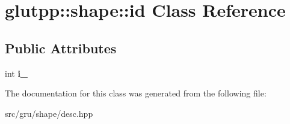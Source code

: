 \hypertarget{classglutpp_1_1shape_1_1id}{\section{glutpp\-:\-:shape\-:\-:id \-Class \-Reference}
\label{classglutpp_1_1shape_1_1id}
}
\subsection*{\-Public \-Attributes}
\begin{DoxyCompactItemize}
\item 
\hypertarget{classglutpp_1_1shape_1_1id_a0831e8c6a4d3ef60f06b28e36a7bf27a}{int {\bfseries i\-\_\-}}\label{classglutpp_1_1shape_1_1id_a0831e8c6a4d3ef60f06b28e36a7bf27a}

\end{DoxyCompactItemize}


\-The documentation for this class was generated from the following file\-:\begin{DoxyCompactItemize}
\item 
src/gru/shape/desc.\-hpp\end{DoxyCompactItemize}
